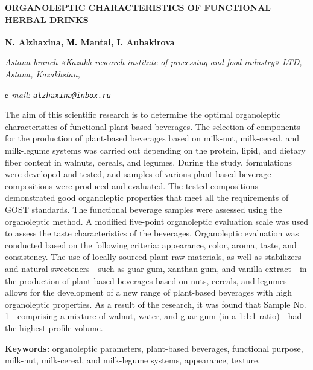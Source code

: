 \begin{articleheader}
{\bfseries ORGANOLEPTIC CHARACTERISTICS OF FUNCTIONAL HERBAL DRINKS}

{\bfseries
N. Alzhaxina\textsuperscript{\envelope },
М. Mantai,
I. Aubakirova}
\end{articleheader}

\begin{affiliation}
\emph{Astana branch «Kazakh research institute of processing and food industry» LTD, Astana, Kazakhstan,}

\emph{е-mail: \href{mailto:alzhaxina@inbox.ru}{\nolinkurl{alzhaxina@inbox.ru}}}
\end{affiliation}

The aim of this scientific research is to determine the optimal
organoleptic characteristics of functional plant-based beverages. The
selection of components for the production of plant-based beverages
based on milk-nut, milk-cereal, and milk-legume systems was carried out
depending on the protein, lipid, and dietary fiber content in walnuts,
cereals, and legumes. During the study, formulations were developed and
tested, and samples of various plant-based beverage compositions were
produced and evaluated. The tested compositions demonstrated good
organoleptic properties that meet all the requirements of GOST
standards. The functional beverage samples were assessed using the
organoleptic method. A modified five-point organoleptic evaluation scale
was used to assess the taste characteristics of the beverages.
Organoleptic evaluation was conducted based on the following criteria:
appearance, color, aroma, taste, and consistency. The use of locally
sourced plant raw materials, as well as stabilizers and natural
sweeteners - such as guar gum, xanthan gum, and vanilla extract - in the
production of plant-based beverages based on nuts, cereals, and legumes
allows for the development of a new range of plant-based beverages with
high organoleptic properties. As a result of the research, it was found
that Sample No. 1 - comprising a mixture of walnut, water, and guar gum
(in a 1:1:1 ratio) - had the highest profile volume.

{\bfseries Keywords:} organoleptic parameters, plant-based beverages,
functional purpose, milk-nut, milk-cereal, and milk-legume systems,
appearance, texture.

